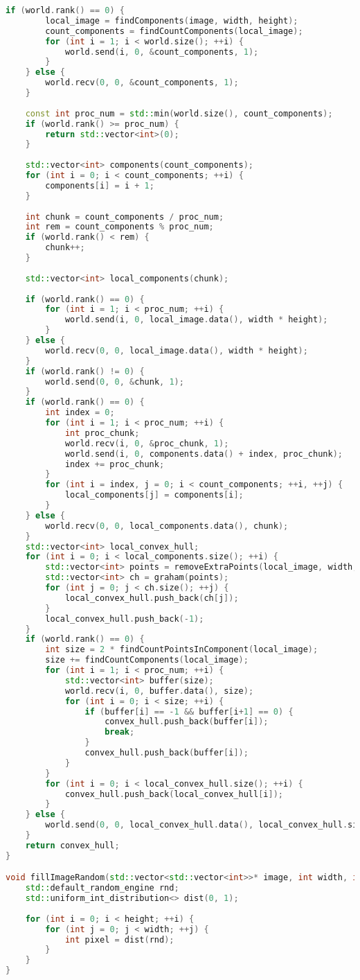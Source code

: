 \documentclass[a4paper, 12pt]{extarticle}
\begin{document}
\begin{lstlisting}[language=C++]
	if (world.rank() == 0) {
		local_image = findComponents(image, width, height);
		count_components = findCountComponents(local_image);
		for (int i = 1; i < world.size(); ++i) {
			world.send(i, 0, &count_components, 1);
		}
	} else {
		world.recv(0, 0, &count_components, 1);
	}
	
	const int proc_num = std::min(world.size(), count_components);
	if (world.rank() >= proc_num) {
		return std::vector<int>(0);
	}
	
	std::vector<int> components(count_components);
	for (int i = 0; i < count_components; ++i) {
		components[i] = i + 1;
	}
	
	int chunk = count_components / proc_num;
	int rem = count_components % proc_num;
	if (world.rank() < rem) {
		chunk++;
	}
	
	std::vector<int> local_components(chunk);
	
	if (world.rank() == 0) {
		for (int i = 1; i < proc_num; ++i) {
			world.send(i, 0, local_image.data(), width * height);
		}
	} else {
		world.recv(0, 0, local_image.data(), width * height);
	}
	if (world.rank() != 0) {
		world.send(0, 0, &chunk, 1);
	}
	if (world.rank() == 0) {
		int index = 0;
		for (int i = 1; i < proc_num; ++i) {
			int proc_chunk;
			world.recv(i, 0, &proc_chunk, 1);
			world.send(i, 0, components.data() + index, proc_chunk);
			index += proc_chunk;
		}
		for (int i = index, j = 0; i < count_components; ++i, ++j) {
			local_components[j] = components[i];
		}
	} else {
		world.recv(0, 0, local_components.data(), chunk);
	}
	std::vector<int> local_convex_hull;
	for (int i = 0; i < local_components.size(); ++i) {
		std::vector<int> points = removeExtraPoints(local_image, width, height, local_components[i]);
		std::vector<int> ch = graham(points);
		for (int j = 0; j < ch.size(); ++j) {
			local_convex_hull.push_back(ch[j]);
		}
		local_convex_hull.push_back(-1);
	}
	if (world.rank() == 0) {
		int size = 2 * findCountPointsInComponent(local_image);
		size += findCountComponents(local_image);
		for (int i = 1; i < proc_num; ++i) {
			std::vector<int> buffer(size);
			world.recv(i, 0, buffer.data(), size);
			for (int i = 0; i < size; ++i) {
				if (buffer[i] == -1 && buffer[i+1] == 0) {
					convex_hull.push_back(buffer[i]);
					break;
				}
				convex_hull.push_back(buffer[i]);
			}
		}
		for (int i = 0; i < local_convex_hull.size(); ++i) {
			convex_hull.push_back(local_convex_hull[i]);
		}
	} else {
		world.send(0, 0, local_convex_hull.data(), local_convex_hull.size());
	}
	return convex_hull;
}

void fillImageRandom(std::vector<std::vector<int>>* image, int width, int height) {
	std::default_random_engine rnd;
	std::uniform_int_distribution<> dist(0, 1);
	
	for (int i = 0; i < height; ++i) {
		for (int j = 0; j < width; ++j) {
			int pixel = dist(rnd);
		}
	}
}
\end{lstlisting}
\end{document}
